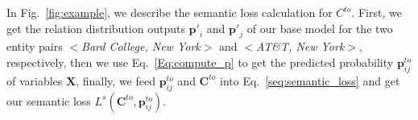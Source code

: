 In Fig.~\ref{fig:example},
we describe the semantic loss calculation for $C^{to}$.
First, we get the relation distribution outputs $\bm{p'}_i$ and $\bm{p'}_j$ of our base model for the two entity pairs $<$\emph{Bard College, New York}$>$ and $<$\emph{AT\&T, New York}$>$, respectively,
then we use Eq.~\ref{Eq:compute_p} to get the predicted probability $\bm{p}^{to}_{ij}$ of variables $\bm{X}$,
finally, we feed $\bm{p}^{to}_{ij}$ and $\bm{C}^{to}$ into Eq.~\ref{seq:semantic_loss} and get our semantic loss $L^{s}(\bm{C}^{to}, \bm{p}^{to}_{ij})$.
\iffalse




